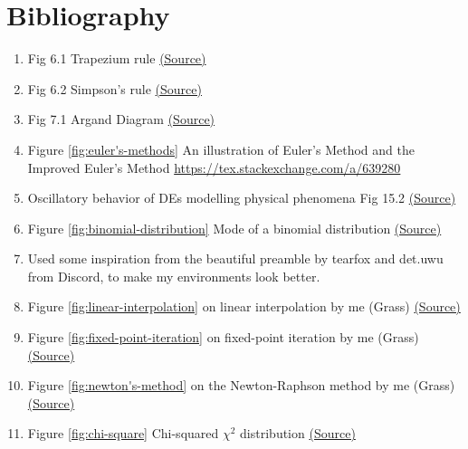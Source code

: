 \documentclass[oneside]{book}
\begin{document}
\chapter{Bibliography}
\begin{enumerate}
  \item Fig 6.1 Trapezium rule \href{https://tex.stackexchange.com/a/110618}{(Source)}
  \item Fig 6.2 Simpson's rule \href{https://tex.stackexchange.com/a/439119}{(Source)}
  \item Fig 7.1 Argand Diagram \href{https://tex.stackexchange.com/a/466846}{(Source)}
  \item Figure \ref{fig:euler's-methods} An illustration of Euler's Method and the Improved Euler's Method \url{https://tex.stackexchange.com/a/639280}
  \item Oscillatory behavior of DEs modelling physical phenomena Fig 15.2 \href{https://tikz.net/dynamics_oscillator/}{(Source)}
  \item Figure \ref{fig:binomial-distribution} Mode of a binomial distribution \href{https://tex.stackexchange.com/a/209658}{(Source)}
  \item Used some inspiration from the beautiful preamble by tearfox and det.uwu from Discord, to make my environments look better.
  \item Figure \ref{fig:linear-interpolation} on linear interpolation by me (Grass) \href{https://www.desmos.com/calculator/jp52nra5le}{(Source)}
  \item Figure \ref{fig:fixed-point-iteration} on fixed-point iteration by me (Grass) \href{https://www.desmos.com/calculator/t9mnqtmhxw}{(Source)}
  \item Figure \ref{fig:newton's-method} on the Newton-Raphson method by me (Grass) \href{https://www.desmos.com/calculator/izkg4ynlfp}{(Source)}
  \item Figure \ref{fig:chi-square} Chi-squared \(\chi^2\) distribution \href{https://commons.wikimedia.org/wiki/File:Chi-square_pdf.svg}{(Source)}
\end{enumerate}
\end{document}
